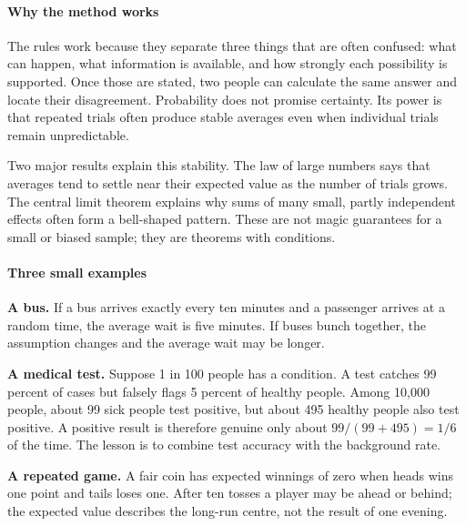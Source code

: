 \paragraph{Why the method works}
The rules work because they separate three things that are often confused: what can happen, what information is available, and how strongly each possibility is supported. Once those are stated, two people can calculate the same answer and locate their disagreement. Probability does not promise certainty. Its power is that repeated trials often produce stable averages even when individual trials remain unpredictable.

Two major results explain this stability. The law of large numbers says that averages tend to settle near their expected value as the number of trials grows. The central limit theorem explains why sums of many small, partly independent effects often form a bell-shaped pattern. These are not magic guarantees for a small or biased sample; they are theorems with conditions.

\paragraph{Three small examples}
\textbf{A bus.} If a bus arrives exactly every ten minutes and a passenger arrives at a random time, the average wait is five minutes. If buses bunch together, the assumption changes and the average wait may be longer.

\textbf{A medical test.} Suppose 1 in 100 people has a condition. A test catches 99 percent of cases but falsely flags 5 percent of healthy people. Among 10,000 people, about 99 sick people test positive, but about 495 healthy people also test positive. A positive result is therefore genuine only about $99/(99+495)=1/6$ of the time. The lesson is to combine test accuracy with the background rate.

\textbf{A repeated game.} A fair coin has expected winnings of zero when heads wins one point and tails loses one. After ten tosses a player may be ahead or behind; the expected value describes the long-run centre, not the result of one evening.

